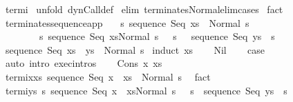 \begin{isabellebody}
%
\endisadelimproof
%
\isatagproof
{}\isamarkupfalse%
\ termi\isanewline
{}\isamarkupfalse%
\ {\isacharparenleft}unfold\ dynCall{\isacharunderscore}def{\isacharparenright}\isanewline
{}\isamarkupfalse%
\ {\isacharparenleft}elim\ terminates{\isacharunderscore}Normal{\isacharunderscore}elim{\isacharunderscore}cases{\isacharparenright}\isanewline
{}\isamarkupfalse%
\ fact\isanewline
{}\isamarkupfalse%
%
\endisatagproof
{\isafoldproof}%
%
\isadelimproof
%
\endisadelimproof
%
\isamarkuptrue%
\isamarkupfalse%
\ terminates{\isacharunderscore}sequence{\isacharunderscore}app{\isacharcolon}\ \isanewline
\ \ {\isachardoublequoteopen}{\isasymAnd}s{\isachardot}\ {\isasymlbrakk}{\isasymGamma}{\isasymturnstile}sequence\ Seq\ xs\ {\isasymdown}\ Normal\ s{\isacharsemicolon}\isanewline
\ \ \ \ \ \ \ \ {\isasymforall}s{\isacharprime}{\isachardot}\ {\isasymGamma}{\isasymturnstile}{\isasymlangle}sequence\ Seq\ xs{\isacharcomma}Normal\ s\ {\isasymrangle}\ {\isasymRightarrow}\ s{\isacharprime}\ {\isasymlongrightarrow}\ \ {\isasymGamma}{\isasymturnstile}sequence\ Seq\ ys\ {\isasymdown}\ s{\isacharprime}{\isasymrbrakk}\isanewline
{\isasymLongrightarrow}\ {\isasymGamma}{\isasymturnstile}sequence\ Seq\ {\isacharparenleft}xs\ {\isacharat}\ ys{\isacharparenright}\ {\isasymdown}\ Normal\ s{\isachardoublequoteclose}\isanewline
%
\isadelimproof
%
\endisadelimproof
%
\isatagproof
{}\isamarkupfalse%
\ {\isacharparenleft}induct\ xs{\isacharparenright}\isanewline
\ \ \isamarkupfalse%
\ Nil\isanewline
\ \ \isamarkupfalse%
\ {\isacharquery}case\ \isamarkupfalse%
\ {\isacharparenleft}auto\ intro{\isacharcolon}\ exec{\isachardot}intros{\isacharparenright}\isanewline
{}\isamarkupfalse%
\isanewline
\ \ \isamarkupfalse%
\ {\isacharparenleft}Cons\ x\ xs{\isacharparenright}\isanewline
\ \ \isamarkupfalse%
\ termi{\isacharunderscore}x{\isacharunderscore}xs{\isacharcolon}\ {\isachardoublequoteopen}{\isasymGamma}{\isasymturnstile}sequence\ Seq\ {\isacharparenleft}x\ {\isacharhash}\ xs{\isacharparenright}\ {\isasymdown}\ Normal\ s{\isachardoublequoteclose}\ \isamarkupfalse%
\ fact\isanewline
\ \ \isamarkupfalse%
\ termi{\isacharunderscore}ys{\isacharcolon}\ {\isachardoublequoteopen}{\isasymforall}s{\isacharprime}{\isachardot}\ {\isasymGamma}{\isasymturnstile}{\isasymlangle}sequence\ Seq\ {\isacharparenleft}x\ {\isacharhash}\ xs{\isacharparenright}{\isacharcomma}Normal\ s\ {\isasymrangle}\ {\isasymRightarrow}\ s{\isacharprime}\ {\isasymlongrightarrow}\ {\isasymGamma}{\isasymturnstile}sequence\ Seq\ ys\ {\isasymdown}\ s{\isacharprime}{\isachardoublequoteclose}\ \isamarkupfalse%

\end{isabellebody}
